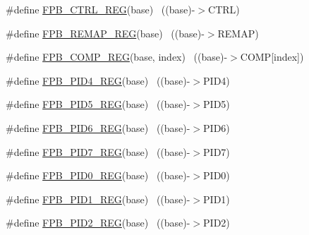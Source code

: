 \begin{DoxyCompactItemize}
\item 
\#define \hyperlink{group___f_p_b___register___accessor___macros_ga51c51db7f0fa370f16b973df21399a88}{F\+P\+B\+\_\+\+C\+T\+R\+L\+\_\+\+R\+EG}(base)                                          ~((base)-\/$>$C\+T\+RL)
\item 
\#define \hyperlink{group___f_p_b___register___accessor___macros_gaa4d1a55b94416f3ef869793d4d461e5c}{F\+P\+B\+\_\+\+R\+E\+M\+A\+P\+\_\+\+R\+EG}(base)                                        ~((base)-\/$>$R\+E\+M\+AP)
\item 
\#define \hyperlink{group___f_p_b___register___accessor___macros_ga52fd8faa26cc52d39d15e4897e218bcb}{F\+P\+B\+\_\+\+C\+O\+M\+P\+\_\+\+R\+EG}(base,  index)                              ~((base)-\/$>$C\+O\+MP\mbox{[}index\mbox{]})
\item 
\#define \hyperlink{group___f_p_b___register___accessor___macros_gac4488406275c11c81ee5843d2686d198}{F\+P\+B\+\_\+\+P\+I\+D4\+\_\+\+R\+EG}(base)                                          ~((base)-\/$>$P\+I\+D4)
\item 
\#define \hyperlink{group___f_p_b___register___accessor___macros_ga7272b28f89b58ec02dab267cd22e503e}{F\+P\+B\+\_\+\+P\+I\+D5\+\_\+\+R\+EG}(base)                                          ~((base)-\/$>$P\+I\+D5)
\item 
\#define \hyperlink{group___f_p_b___register___accessor___macros_gaf5bfa0e3353fc7448eebb0069982ef26}{F\+P\+B\+\_\+\+P\+I\+D6\+\_\+\+R\+EG}(base)                                          ~((base)-\/$>$P\+I\+D6)
\item 
\#define \hyperlink{group___f_p_b___register___accessor___macros_gacd70110093ba38643ce4f76ca99d6c66}{F\+P\+B\+\_\+\+P\+I\+D7\+\_\+\+R\+EG}(base)                                          ~((base)-\/$>$P\+I\+D7)
\item 
\#define \hyperlink{group___f_p_b___register___accessor___macros_ga3f10cec0f0637403303c41c9088dc5bb}{F\+P\+B\+\_\+\+P\+I\+D0\+\_\+\+R\+EG}(base)                                          ~((base)-\/$>$P\+I\+D0)
\item 
\#define \hyperlink{group___f_p_b___register___accessor___macros_ga8859e6bda39b2725ed2f5d45e22d7b50}{F\+P\+B\+\_\+\+P\+I\+D1\+\_\+\+R\+EG}(base)                                          ~((base)-\/$>$P\+I\+D1)
\item 
\#define \hyperlink{group___f_p_b___register___accessor___macros_gac97cbee200bbd12a267ec742005eaa0f}{F\+P\+B\+\_\+\+P\+I\+D2\+\_\+\+R\+EG}(base)                                          ~((base)-\/$>$P\+I\+D2)
\item 

\end{DoxyCompactItemize}
